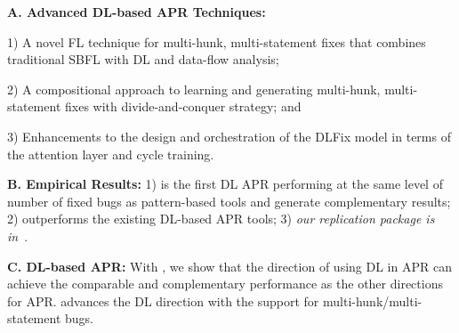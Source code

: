   



  {\bf A. Advanced DL-based APR Techniques:}

  1) A novel FL technique for multi-hunk,
  multi-statement fixes that combines traditional SBFL with DL and
  data-flow analysis;

  2) A compositional approach to learning and generating multi-hunk,
  multi-statement fixes with divide-and-conquer strategy; and

  3) Enhancements to the design and orchestration of the DLFix model
  in terms of the attention layer and cycle training.



{\bf B. Empirical Results:} 1) {\tool} is the first DL APR
performing at the same level of number of fixed bugs as pattern-based tools
and generate complementary results;  2) \tool outperforms the
existing DL-based APR tools; 3) {\em our replication package is in~\cite{AutoFix2021}}.

{\bf C. DL-based APR:} 
With {\tool}, we show that the
  direction of using DL in APR can achieve the comparable and
  complementary performance as the other directions for APR.  {\tool}
  advances the DL direction with the support for
  multi-hunk/multi-statement bugs.
